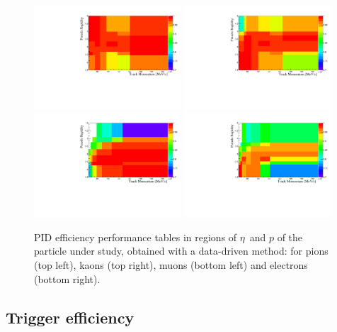 \begin{figure}[h!]
\centering
\includegraphics[width=0.49\textwidth]{RKst/figs/pid_Pi.pdf}
\includegraphics[width=0.49\textwidth]{RKst/figs/pid_K.pdf}
\includegraphics[width=0.49\textwidth]{RKst/figs/pid_Mu.pdf}
\includegraphics[width=0.49\textwidth]{RKst/figs/pid_e.pdf}
\caption{PID efficiency performance tables in regions of $\eta$~and $p$ of the particle under study, 
obtained with a data-driven method: for pions (top left), kaons (top right), muons (bottom left) 
and electrons (bottom right).}
\label{fig:pid_perf_hist}
\end{figure}


\subsection{Trigger efficiency}
\label{sec:RKst_trigger_eff}

